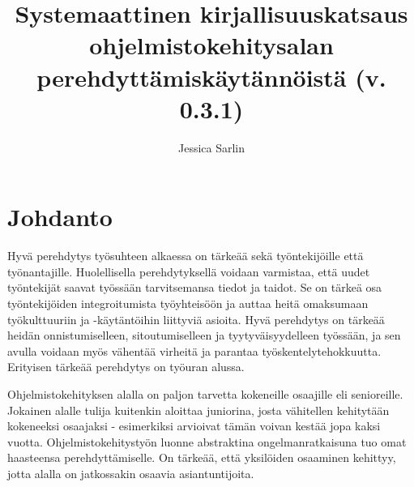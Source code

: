 \documentclass[utf8]{gradu3}
\begin{document}
\title{Systemaattinen kirjallisuuskatsaus ohjelmistokehitysalan perehdyttämiskäytännöistä (v. 0.3.1)}



\author{Jessica Sarlin}


\maketitle

\mainmatter

\chapter{Johdanto}



Hyvä perehdytys työsuhteen alkaessa on tärkeää sekä työntekijöille että työnantajille. Huolellisella perehdytyksellä voidaan varmistaa, että uudet työntekijät saavat työssään tarvitsemansa tiedot ja taidot. Se on tärkeä osa työntekijöiden integroitumista työyhteisöön ja auttaa heitä omaksumaan työkulttuuriin ja -käytäntöihin liittyviä asioita. Hyvä perehdytys on tärkeää heidän onnistumiselleen, sitoutumiselleen ja tyytyväisyydelleen työssään, ja sen avulla voidaan myös vähentää virheitä ja parantaa työskentelytehokkuutta. Erityisen tärkeää perehdytys on työuran alussa.

Ohjelmistokehityksen alalla on paljon tarvetta kokeneille osaajille eli senioreille. Jokainen alalle tulija kuitenkin aloittaa juniorina, josta vähitellen kehitytään kokeneeksi osaajaksi - esimerkiksi \textcite{bologa-lupu-2014} arvioivat tämän voivan kestää jopa kaksi vuotta. Ohjelmistokehitystyön luonne abstraktina ongelmanratkaisuna tuo omat haasteensa perehdyttämiselle. On tärkeää, että yksilöiden osaaminen kehittyy, jotta alalla on jatkossakin osaavia asiantuntijoita.
\end{document}
